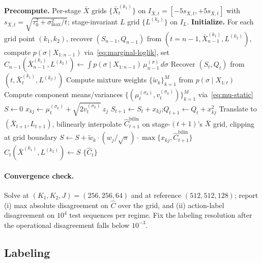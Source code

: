 \documentclass[11pt]{article}
\begin{document}
\begin{algorithm}[H]
\caption{Approximate DP for the random-variance Bayes-optimal threshold.}
\label{alg:adp-random}
\begin{algorithmic}[1]
\State \textbf{Precompute.} Per-stage $\bar X$ grids $\{\bar X_t^{(k_1)}\}$ on $I_{\bar X, t} = [-5 s_{\bar X, t}, +5 s_{\bar X, t}]$ with $s_{\bar X, t} = \sqrt{\tau_0^2 + \sigma_{\max}^2 / t}$; stage-invariant $L$ grid $\{L^{(k_2)}\}$ on $I_L$.
\State \textbf{Initialize.} For each grid point $(k_1, k_2)$, recover $(S_{n-1}, Q_{n-1})$ from $(t = n-1, \bar X_{n-1}^{(k_1)}, L^{(k_2)})$, compute $p(\sigma \mid X_{1:n-1})$ via~\eqref{eq:marginal-loglik}, set $\widehat C_{n-1}(\bar X_{n-1}^{(k_1)}, L^{(k_2)}) \gets \int p(\sigma \mid X_{1:n-1})\, \mu_{n-1}^{(\sigma)}\, d\sigma$
    \State Recover $(S_t, Q_t)$ from $(t, \bar X_t^{(k_1)}, L^{(k_2)})$
    \State Compute mixture weights $\{\tilde w_k\}_{k=1}^M$ from $p(\sigma \mid X_{1:t})$
    \State Compute component means/variances $\{(\mu_t^{(\sigma_k)}, v_t^{(\sigma_k)})\}_{k=1}^M$ via~\eqref{eq:mu-static}
    \State $S \gets 0$
      \State $x_{kj} \gets \mu_t^{(\sigma_k)} + \sqrt{2 v_t^{(\sigma_k)}}\, z_j$
      \State $S_{t+1} \gets S_t + x_{kj}$;\quad $Q_{t+1} \gets Q_t + x_{kj}^2$
      \State Translate to $(\bar X_{t+1}, L_{t+1})$, bilinearly interpolate $\widehat C_{t+1}^{\mathrm{bilin}}$ on stage-$(t{+}1)$'s $\bar X$ grid, clipping at grid boundary
      \State $S \gets S + \tilde w_k \cdot (w_j/\sqrt\pi) \cdot \max\!\big\{x_{kj}, \widehat C_{t+1}^{\mathrm{bilin}}\big\}$
    \EndFor
    \State $\widehat C_t(\bar X^{(k_1)}, L^{(k_2)}) \gets S$
  \EndFor
\EndFor
\State \Return $\{\widehat C_t\}$
\end{algorithmic}
\end{algorithm}

\paragraph{Convergence check.} Solve at $(K_1, K_2, J) = (256, 256, 64)$ and at reference $(512, 512, 128)$; report (i) max absolute disagreement on $\widehat C$ over the grid, and (ii) action-label disagreement on $10^4$ test sequences per regime. Fix the labeling resolution after the operational disagreement falls below $10^{-3}$.

\subsection{Labeling}
\label{sec:labeling}
\end{document}
